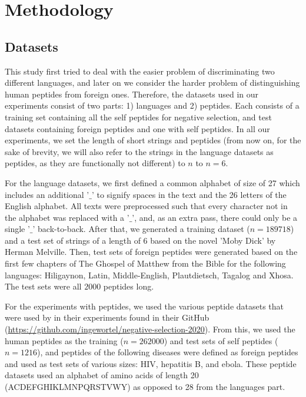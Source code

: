 \documentclass{article}
\begin{document}
\section{Methodology}
\subsection{Datasets} \label{datasets}

This study first tried to deal with the easier problem of discriminating two different languages, and later on we consider the harder problem of distinguishing human peptides from foreign ones. 
Therefore, the datasets used in our experiments consist of two parts: 1) languages and 2) peptides.
Each consists of a training set containing all the self peptides for negative selection, and test datasets containing foreign peptides and one with self peptides.
In all our experiments, we set the length of short strings and peptides (from now on, for the sake of brevity, we will also refer to the strings in the language datasets as peptides, as they are functionally not different) to $n$ to $n=6$.

For the language datasets, we first defined a common alphabet of size of 27 which includes an additional '$\_$' to signify spaces in the text and the 26 letters of the English alphabet.
All texts were preprocessed such that every character not in the alphabet was replaced with a '$\_$', and, as an extra pass, there could only be a single '$\_$' back-to-back.
After that, we generated a training dataset ($n=189718$) and a test set of strings of a length of 6 based on the novel 'Moby Dick' by Herman Melville.
Then, test sets of foreign peptides were generated based on the first few chapters of The Ghospel of Matthew from the Bible for the following languages: Hiligaynon, Latin, Middle-English, 
Plautdietsch, Tagalog and Xhosa. The test sets were all $2000$ peptides long.

For the experiments with peptides, we used the various peptide datasets that were used by \textcite{wortel2020t} in their experiments found in their GitHub (\url{https://github.com/ingewortel/negative-selection-2020}).
From this, we used the human peptides as the training ($n=262000$) and test sets of self peptides ($n=1216$), and peptides of the following diseases were defined as foreign peptides and used as test sets of various sizes: HIV, hepatitis B, and ebola. 
These peptide datasets used an alphabet of amino acids of length 20 (ACDEFGHIKLMNPQRSTVWY) as opposed to 28 from the languages part.
\end{document}
